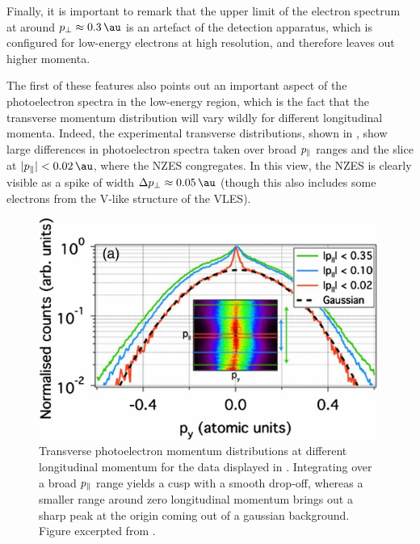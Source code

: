 Finally, it is important to remark that the upper limit of the electron spectrum at around $\pt\approx\SI{0.3}{\au}$ is an artefact of the detection apparatus, which is configured for low-energy electrons at high resolution, and therefore leaves out higher momenta.


The first of these features also points out an important aspect of the photoelectron spectra in the low-energy region, which is the fact that the transverse momentum distribution will vary wildly for different longitudinal momenta. Indeed, the experimental transverse distributions, shown in , show large differences in photoelectron spectra taken over broad ${p_{\parallel}}$ ranges and the slice at $|\pp|<\SI{0.02}{\au}$, where the NZES congregates. In this view, the NZES is clearly visible as a spike of width $\Delta\pt\approx\SI{0.05}{\au}$ (though this also includes some electrons from the V-like structure of the VLES).





\begin{figure}[hb]
  \centering
  \includegraphics[scale=1.2]{6-LES/Figures/figure6E.jpg}
  \caption[
  Experimental transverse photoelectron momentum spectra at different longitudinal momenta, observed by Pullen et al.]{
  Transverse photoelectron momentum distributions at different longitudinal momentum for the data displayed in . Integrating over a broad ${p_{\parallel}}$ range yields a cusp with a smooth drop-off, whereas a smaller range around zero longitudinal momentum brings out a sharp peak at the origin coming out of a gaussian background.
  Figure excerpted from .
  }
\label{f6-pullen-original-transverse-spectrum}
\end{figure}
%
%



